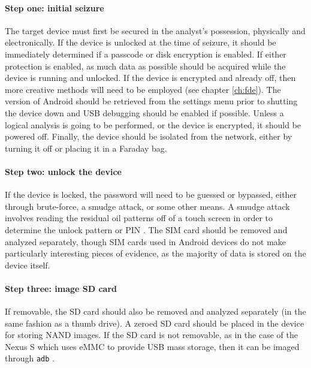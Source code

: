 \paragraph{Step one: initial seizure}
The target device must first be secured in the analyst's possession, physically and electronically.  If the device is unlocked at
the time of seizure, it should be immediately determined if a passcode or disk encryption is enabled. If either protection is
enabled, as much data as possible should be acquired while the device is running and unlocked.  If the device is encrypted and
already off, then more creative methods will need to be employed (see chapter \ref{ch:fde}).  The version of Android should be
retrieved from the settings menu prior to shutting the device down and USB debugging should be enabled if possible.  Unless a
logical analysis is going to be performed, or the device is encrypted, it should be powered off.  Finally, the device should be
isolated from the network, either by turning it off or placing it in a Faraday bag.

\paragraph{Step two: unlock the device}
If the device is locked, the password will need to be guessed or bypassed, either through brute-force, a smudge attack, or some
other means.  A smudge attack involves reading the residual oil patterns off of a touch screen in order to determine the unlock
pattern or PIN \cite{smudge}. The SIM card should be removed and analyzed separately, though SIM cards used in Android devices do
not make particularly interesting pieces of evidence, as the majority of data is stored on the device itself.

\paragraph{Step three: image SD card}
 If removable, the SD card should also be removed and analyzed separately (in the same fashion as a thumb drive). A zeroed SD card
should be placed in the device for storing NAND images. If the SD card is not removable, as in the case of the Nexus S which uses
eMMC to provide USB mass storage, then it can be imaged through \texttt{adb} \cite[pp. 211-218]{hoog}.
 
